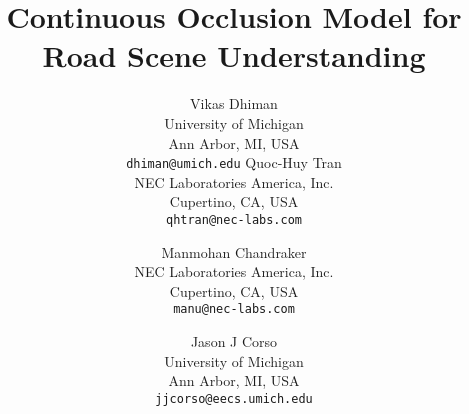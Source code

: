\documentclass[10pt,twocolumn,letterpaper]{article}
\begin{document}
\title{Continuous Occlusion Model for Road Scene Understanding}

\author{Vikas Dhiman\\
  University of Michigan\\
  Ann Arbor, MI, USA\\
{\tt\small dhiman@umich.edu}
Quoc-Huy Tran\\
NEC Laboratories America, Inc.\\
Cupertino, CA, USA\\
{\tt\small qhtran@nec-labs.com}
\and
Manmohan Chandraker\\
NEC Laboratories America, Inc.\\
Cupertino, CA, USA\\
{\tt\small manu@nec-labs.com}
\and
Jason J Corso\\
  University of Michigan\\
  Ann Arbor, MI, USA\\
{\tt\small jjcorso@eecs.umich.edu}
}

\maketitle









%







{\small


}
\end{document}
